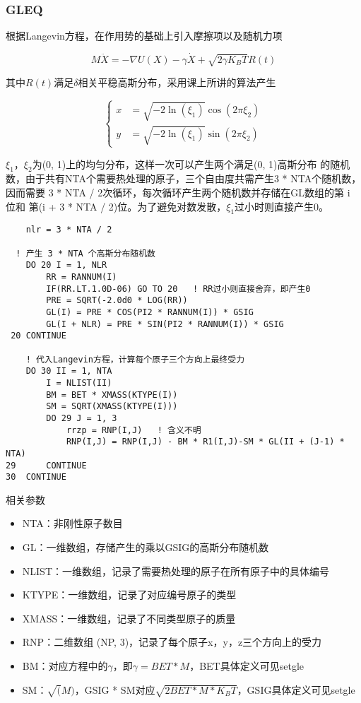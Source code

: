 \documentclass[UTF-8]{ctexart}
\begin{document}
\subsubsection{GLEQ}

根据Langevin方程，在作用势的基础上引入摩擦项以及随机力项

\begin{equation}
    M\ddot{X} = -\nabla U(X) - \gamma \dot{X} + \sqrt{2\gamma K_BT}R(t)
\end{equation}

其中$R(t)$满足$\delta$相关平稳高斯分布，采用课上所讲的算法产生

\begin{equation}
    \left\{
    \begin{aligned}
        x & = \sqrt{-2\ln(\xi_1)}\cos(2\pi\xi_2) \\
        y & = \sqrt{-2\ln(\xi_1)}\sin(2\pi\xi_2)
    \end{aligned}
    \right.
\end{equation}

$\xi_1$，$\xi_2$为(0, 1)上的均匀分布，这样一次可以产生两个满足(0, 1)高斯分布
的随机数，由于共有NTA个需要热处理的原子，三个自由度共需产生3 * NTA个随机数，
因而需要 3 * NTA / 2次循环，每次循环产生两个随机数并存储在GL数组的第 i 位和
第(i + 3 * NTA / 2)位。为了避免对数发散，$\xi_1$过小时则直接产生0。

\begin{verbatim}
    nlr = 3 * NTA / 2
      
  ! 产生 3 * NTA 个高斯分布随机数
    DO 20 I = 1, NLR
        RR = RANNUM(I)
        IF(RR.LT.1.0D-06) GO TO 20   ! RR过小则直接舍弃，即产生0
        PRE = SQRT(-2.0d0 * LOG(RR))
        GL(I) = PRE * COS(PI2 * RANNUM(I)) * GSIG
        GL(I + NLR) = PRE * SIN(PI2 * RANNUM(I)) * GSIG
 20 CONTINUE

    ! 代入Langevin方程，计算每个原子三个方向上最终受力
    DO 30 II = 1, NTA
        I = NLIST(II)
        BM = BET * XMASS(KTYPE(I))
        SM = SQRT(XMASS(KTYPE(I)))
        DO 29 J = 1, 3
            rrzp = RNP(I,J)   ! 含义不明
            RNP(I,J) = RNP(I,J) - BM * R1(I,J)-SM * GL(II + (J-1) * NTA)
29      CONTINUE
30  CONTINUE
\end{verbatim}

\noindent
相关参数

\begin{itemize}
    \item NTA：非刚性原子数目
    \item GL：一维数组，存储产生的乘以GSIG的高斯分布随机数
    \item NLIST：一维数组，记录了需要热处理的原子在所有原子中的具体编号
    \item KTYPE：一维数组，记录了对应编号原子的类型
    \item XMASS：一维数组，记录了不同类型原子的质量
    \item RNP：二维数组 (NP, 3)，记录了每个原子x，y，z三个方向上的受力
    \item BM：对应方程中的$\gamma$，即$\gamma = BET * M$，BET具体定义可见setgle
    \item SM：$\sqrt(M)$，GSIG * SM对应$\sqrt{2 BET * M * K_B T}$，GSIG具体定义可见setgle
\end{itemize}
\end{document}
